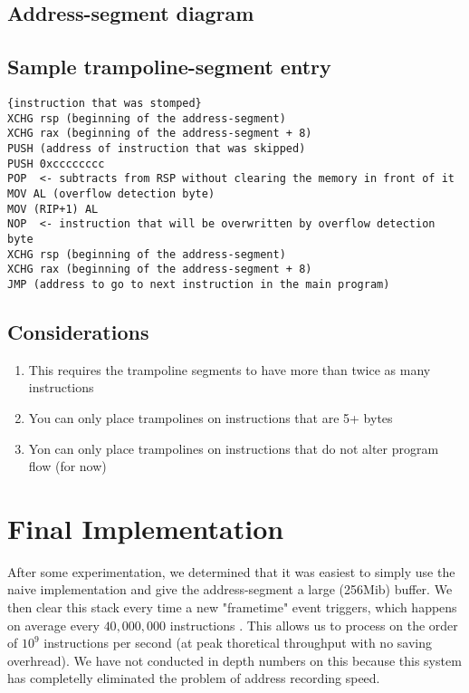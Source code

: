 \subsection{Address-segment diagram}
\begin{drawstack}
  \startframe
   
   \cellcom{}
     
  \startframe
   \cellcom{}
     
   
   \cellcom{}
   \cellcom{}
   \cellcom{}
   
\end{drawstack}


\subsection{Sample trampoline-segment entry}

\begin{verbatim}
{instruction that was stomped}
XCHG rsp (beginning of the address-segment)
XCHG rax (beginning of the address-segment + 8)
PUSH (address of instruction that was skipped)
PUSH 0xcccccccc
POP  <- subtracts from RSP without clearing the memory in front of it 
MOV AL (overflow detection byte) 
MOV (RIP+1) AL
NOP  <- instruction that will be overwritten by overflow detection byte
XCHG rsp (beginning of the address-segment)
XCHG rax (beginning of the address-segment + 8)
JMP (address to go to next instruction in the main program)
\end{verbatim}


\subsection{Considerations}
\begin{enumerate}
    \item This requires the trampoline segments to have more than twice as many instructions
    \item You can only place trampolines on instructions that are 5+ bytes 
    \item Yon can only place trampolines on instructions that do not alter program flow (for now)
\end{enumerate}
\section{Final Implementation}
After some experimentation, we determined that it was easiest to simply use the naive implementation and give the address-segment a large (256Mib) buffer. We then clear this stack every time a new "frametime" event triggers, which happens on average every $40,000,000$ instructions \cite[Scheduler.h:72]{librr-src}. This allows us to process on the order of $10^9$ instructions per second (at peak thoretical throughput with no saving overhread). We have not conducted in depth numbers on this because this system has completelly eliminated the problem of address recording speed. 


